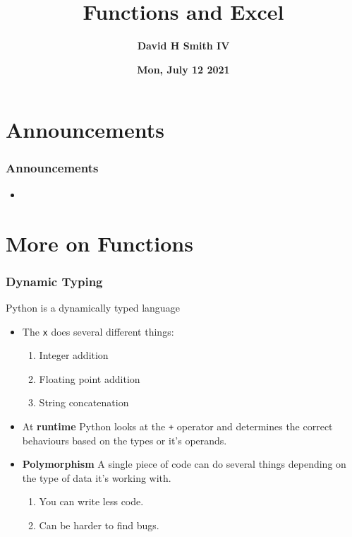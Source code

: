 \documentclass{beamer}
\title{\textbf{Functions and Excel}}
\author{\textbf{David H Smith IV}}
\institute[\textbf{UIUC}]{\textbf{University of Illinois Urbana-Champaign}}
\date{\textbf{Mon, July 12 2021}}
\begin{document}
\frame{\titlepage}

\section{Announcements}

%
%
\begin{frame}
  \frametitle{Announcements}
  \begin{itemize}
    \item 
  \end{itemize}
\end{frame}

\section{More on Functions}

%
%
\begin{frame}[fragile]
  \frametitle{Dynamic Typing}
  Python is a dynamically typed language
  \begin{itemize}
    \item The \lstinline|x| does several different things:
      \begin{enumerate}
        \item Integer addition
        \item Floating point addition
        \item String concatenation
      \end{enumerate}
    \item At \textbf{runtime} Python looks at the \lstinline|+| operator and determines the correct behaviours based on the types or it's operands.
    \item \textbf{Polymorphism} \textrightarrow A single piece of code can do several things depending on the type of data it's working with.
      \begin{enumerate}
        \item You can write less code.
        \item Can be harder to find bugs.
      \end{enumerate}

  \end{itemize}
\end{frame}
\end{document}
